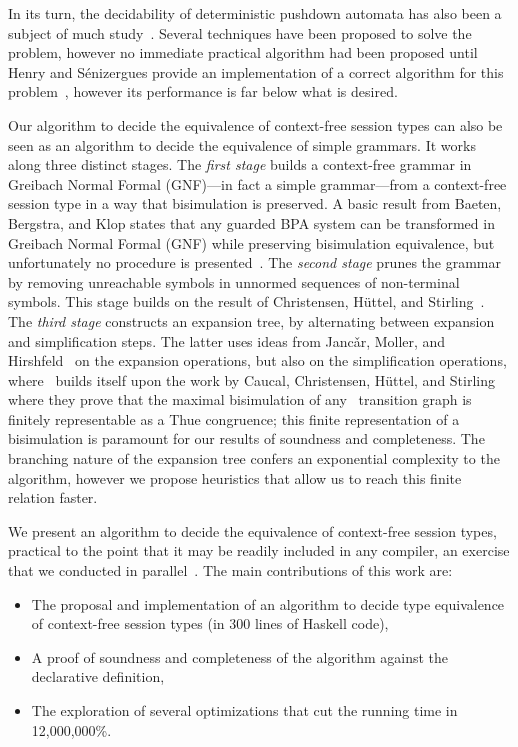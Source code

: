 In its turn, the decidability of deterministic pushdown automata 
has also been a subject of much 
study~\cite{janvcar2008selected,senizergues1997equivalence,stirling2001decidability}. 
Several techniques have been proposed to solve the problem, 
however no immediate practical algorithm had been proposed until
Henry and S{\'e}nizergues provide an implementation of a correct algorithm 
for this problem~\cite{henry2013lalblc}, however its performance is far below 
what is desired.


Our algorithm to decide the equivalence of context-free session types
can also be seen as an algorithm to decide the equivalence of simple 
grammars. It works along three distinct stages.
%
The \emph{first stage} builds a context-free grammar in Greibach
Normal Formal (GNF)---in fact a simple grammar---from a context-free
session type in a way that bisimulation is preserved.  A basic result
from Baeten, Bergstra, and Klop states that any guarded BPA system can
be transformed in Greibach Normal Formal (GNF) while preserving
bisimulation equivalence, but unfortunately no procedure is
presented~\cite{baeten1993decidability}.
%
The \emph{second stage} prunes the grammar by removing unreachable
symbols in unnormed sequences of non-terminal symbols. This stage
builds on the result of Christensen, H\"uttel, and Stirling~\cite{DBLP:journals/iandc/ChristensenHS95}.
%
The \emph{third stage} constructs an expansion tree, by alternating
between expansion and simplification steps. The latter
uses ideas from Janc\v
ar, Moller, and
Hirshfeld~\cite{hirshfeld1996bisimulation,janvcar1999techniques}
on the expansion operations, but also on the simplification
operations, where~\cite{janvcar1999techniques} builds itself
upon the work by Caucal, Christensen, H\"uttel, and 
Stirling~\cite{caucal1986decidabilite, DBLP:journals/iandc/ChristensenHS95}
where they prove that the maximal bisimulation of any \BPA\ 
transition graph is finitely representable as a Thue congruence; 
this finite representation of a bisimulation is paramount for our results 
of soundness and completeness. The branching nature 
of the expansion tree confers an exponential complexity to the algorithm, 
however we propose heuristics that allow us to reach this finite relation 
faster.

We present an algorithm to decide the equivalence of context-free
session types, practical to the point that it may be readily included
in any compiler, an exercise that we conducted in
parallel~\cite{freeST}.
%
The main contributions of this work are:
%
\begin{itemize}
\item The proposal and implementation of an algorithm to decide type
  equivalence of context-free session types (in 300 lines of Haskell
  code),
\item A proof of soundness and completeness of the algorithm against
  the declarative definition,
\item The exploration of several optimizations that cut the running
  time in 12,000,000\%.
\end{itemize}

